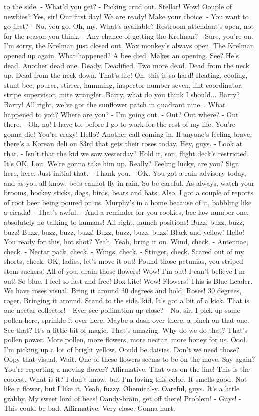 \documentclass{article}
\begin{document}
to the side. - What'd you get? - Picking crud out. Stellar! Wow! Oouple of newbies? Yes, sir! Our first day! We are ready! Make your choice. - You want to go first? - No, you go. Oh, my. What's available? Restroom attendant's open, not for the reason you think. - Any chance of getting the Krelman? - Sure, you're on. I'm sorry, the Krelman just closed out. Wax monkey's always open. The Krelman opened up again. What happened? A bee died. Makes an opening. See? He's dead. Another dead one. Deady. Deadified. Two more dead. Dead from the neck up. Dead from the neck down. That's life! Oh, this is so hard! Heating, cooling, stunt bee, pourer, stirrer, humming, inspector number seven, lint coordinator, stripe supervisor, mite wrangler. Barry, what do you think I should... Barry? Barry! All right, we've got the sunflower patch in quadrant nine... What happened to you? Where are you? - I'm going out. - Out? Out where? - Out there. - Oh, no! I have to, before I go to work for the rest of my life. You're gonna die! You're crazy! Hello? Another call coming in. If anyone's feeling brave, there's a Korean deli on 83rd that gets their roses today. Hey, guys. - Look at that. - Isn't that the kid we saw yesterday? Hold it, son, flight deck's restricted. It's OK, Lou. We're gonna take him up. Really? Feeling lucky, are you? Sign here, here. Just initial that. - Thank you. - OK. You got a rain advisory today, and as you all know, bees cannot fly in rain. So be careful. As always, watch your brooms, hockey sticks, dogs, birds, bears and bats. Also, I got a couple of reports of root beer being poured on us. Murphy's in a home because of it, babbling like a cicada! - That's awful. - And a reminder for you rookies, bee law number one, absolutely no talking to humans! All right, launch positions! Buzz, buzz, buzz, buzz! Buzz, buzz, buzz, buzz! Buzz, buzz, buzz, buzz! Black and yellow! Hello! You ready for this, hot shot? Yeah. Yeah, bring it on. Wind, check. - Antennae, check. - Nectar pack, check. - Wings, check. - Stinger, check. Scared out of my shorts, check. OK, ladies, let's move it out! Pound those petunias, you striped stem-suckers! All of you, drain those flowers! Wow! I'm out! I can't believe I'm out! So blue. I feel so fast and free! Box kite! Wow! Flowers! This is Blue Leader. We have roses visual. Bring it around 30 degrees and hold. Roses! 30 degrees, roger. Bringing it around. Stand to the side, kid. It's got a bit of a kick. That is one nectar collector! - Ever see pollination up close? - No, sir. I pick up some pollen here, sprinkle it over here. Maybe a dash over there, a pinch on that one. See that? It's a little bit of magic. That's amazing. Why do we do that? That's pollen power. More pollen, more flowers, more nectar, more honey for us. Oool. I'm picking up a lot of bright yellow. Oould be daisies. Don't we need those? Oopy that visual. Wait. One of these flowers seems to be on the move. Say again? You're reporting a moving flower? Affirmative. That was on the line! This is the coolest. What is it? I don't know, but I'm loving this color. It smells good. Not like a flower, but I like it. Yeah, fuzzy. Ohemical-y. Oareful, guys. It's a little grabby. My sweet lord of bees! Oandy-brain, get off there! Problem! - Guys! - This could be bad. Affirmative. Very close. Gonna hurt. 
\end{document}
